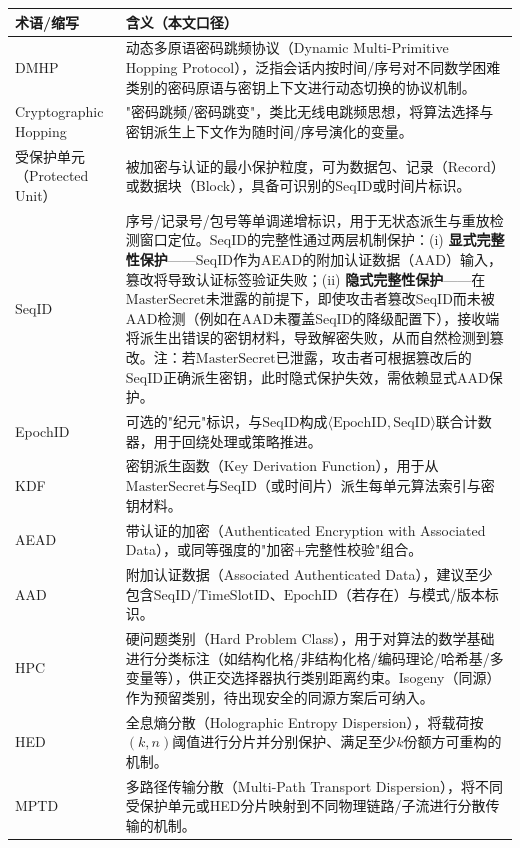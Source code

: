 ﻿\documentclass[12pt,a4paper]{article}
\begin{document}
\begin{longtable}{|p{3.2cm}|p{12.0cm}|}
\hline
\textbf{术语/缩写} & \textbf{含义（本文口径）} \\
\hline
\endhead
DMHP & 动态多原语密码跳频协议（Dynamic Multi-Primitive Hopping Protocol），泛指会话内按时间/序号对不同数学困难类别的密码原语与密钥上下文进行动态切换的协议机制。\\
\hline
Cryptographic Hopping & "密码跳频/密码跳变"，类比无线电跳频思想，将算法选择与密钥派生上下文作为随时间/序号演化的变量。\\
\hline
受保护单元（Protected Unit） & 被加密与认证的最小保护粒度，可为数据包、记录（Record）或数据块（Block），具备可识别的$\text{SeqID}$或时间片标识。\\
\hline
SeqID & 序号/记录号/包号等单调递增标识，用于无状态派生与重放检测窗口定位。SeqID的完整性通过两层机制保护：(i) \textbf{显式完整性保护}——SeqID作为AEAD的附加认证数据（AAD）输入，篡改将导致认证标签验证失败；(ii) \textbf{隐式完整性保护}——在$\text{MasterSecret}$未泄露的前提下，即使攻击者篡改SeqID而未被AAD检测（例如在AAD未覆盖SeqID的降级配置下），接收端将派生出错误的密钥材料，导致解密失败，从而自然检测到篡改。注：若$\text{MasterSecret}$已泄露，攻击者可根据篡改后的SeqID正确派生密钥，此时隐式保护失效，需依赖显式AAD保护。\\
\hline
EpochID & 可选的"纪元"标识，与$\text{SeqID}$构成$\langle\text{EpochID},\text{SeqID}\rangle$联合计数器，用于回绕处理或策略推进。\\
\hline
KDF & 密钥派生函数（Key Derivation Function），用于从$\text{MasterSecret}$与$\text{SeqID}$（或时间片）派生每单元算法索引与密钥材料。\\
\hline
AEAD & 带认证的加密（Authenticated Encryption with Associated Data），或同等强度的"加密+完整性校验"组合。\\
\hline
AAD & 附加认证数据（Associated Authenticated Data），建议至少包含$\text{SeqID}$/$\text{TimeSlotID}$、$\text{EpochID}$（若存在）与模式/版本标识。\\
\hline
HPC & 硬问题类别（Hard Problem Class），用于对算法的数学基础进行分类标注（如结构化格/非结构化格/编码理论/哈希基/多变量等），供正交选择器执行类别距离约束。Isogeny（同源）作为预留类别，待出现安全的同源方案后可纳入。\\
\hline
HED & 全息熵分散（Holographic Entropy Dispersion），将载荷按$(k,n)$阈值进行分片并分别保护、满足至少$k$份额方可重构的机制。\\
\hline
MPTD & 多路径传输分散（Multi-Path Transport Dispersion），将不同受保护单元或HED分片映射到不同物理链路/子流进行分散传输的机制。\\

\end{longtable}
\end{document}
